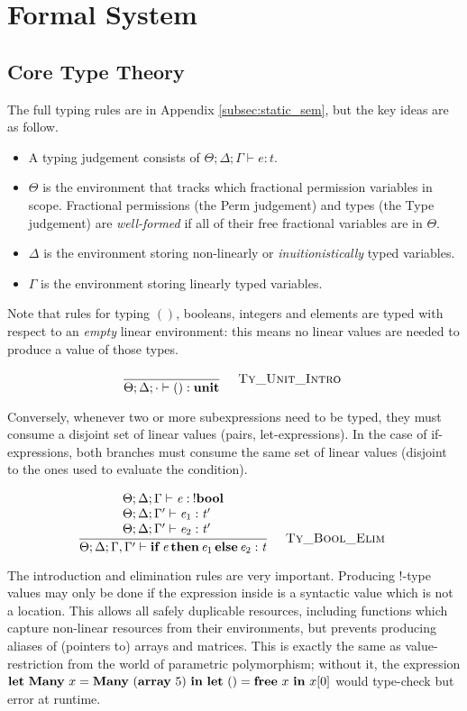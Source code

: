 \section{Formal System}\label{sec:formal_system}

\subsection{Core Type Theory}\label{subsec:core_tt}

The full typing rules are in Appendix \ref{subsec:static_sem}, but the key
ideas are as follow.

\begin{itemize}

    \item A typing judgement consists of $ \Theta; \Delta; \Gamma \vdash e : t$.

    \item $\Theta$ is the environment that tracks which fractional permission variables
        in scope. Fractional permissions (the \textsf{Perm} judgement) and types (the
        \textsf{Type} judgement) are \emph{well-formed} if all of their free fractional
        variables are in $\Theta$.

    \item $\Delta$ is the environment storing non-linearly or \emph{inuitionistically}
        typed variables.

    \item $\Gamma$ is the environment storing linearly typed variables. 

\end{itemize}

Note that rules for typing $()$, booleans, integers and elements are typed
with respect to an \emph{empty} linear environment: this means no linear
values are needed to produce a value of those types.

\vspace{-\baselineskip}
\[
    {\displaystyle\frac{\begin{array}{l} \end{array}}{ \Theta ; \Delta ; \cdot \vdash ( ) : \mathbf{unit}}\quad\textsc{ {\textsc{Ty\_Unit\_Intro}}{} }}
\]

Conversely, whenever two or more subexpressions need to be typed, they must
consume a disjoint set of linear values (pairs, let-expressions).  In the case
of if-expressions, both branches must consume the same set of linear values
(disjoint to the ones used to evaluate the condition).

\vspace{-\baselineskip}
\[
    {\displaystyle\frac{\begin{array}{l} \Theta ; \Delta ; \Gamma \vdash \mathit{e} : \: ! \mathbf{bool} \\ \Theta ; \Delta ; \Gamma' \vdash \mathit{e_{{\mathrm{1}}}} : \mathit{t'} \\ \Theta ; \Delta ; \Gamma' \vdash \mathit{e_{{\mathrm{2}}}} : \mathit{t'} \\ \end{array}}{ \Theta ; \Delta ; \Gamma , \Gamma' \vdash \mathbf{if} \, \mathit{e} \, \mathbf{then} \, \mathit{e_{{\mathrm{1}}}} \, \mathbf{else} \, \mathit{e_{{\mathrm{2}}}} : \mathit{t}}\quad\textsc{ {\textsc{Ty\_Bool\_Elim}}{} }}
\]

The  introduction and elimination rules are very important.
Producing !-type values may only be done if the expression inside is a
syntactic value which is not a location. This allows all safely duplicable
resources, including functions which capture non-linear resources from their
environments, but prevents producing aliases of (pointers to) arrays and
matrices. This is exactly the same as value-restriction from the world of
parametric polymorphism; without it, the expression $\mathbf{let}\ \mathbf{Many}\ x = \mathbf{Many}\
(\mathbf{array}\ 5)\ \mathbf{in}\ \mathbf{let}\ () = \mathbf{free}\ x\ \mathbf{in}\ x[0]$ would
type-check but error at runtime.

